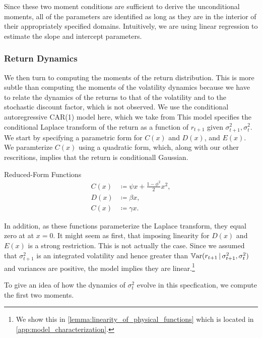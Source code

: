 \documentclass[11pt, letterpaper, twoside, final]{article}
\begin{document}
Since these two moment conditions are sufficient to derive the unconditional moments, all of the parameters are identified as long as they are in the interior of their appropriately specified domains. Intuitively, we are using linear regression to estimate the slope and intercept parameters.

\subsubsection{Return Dynamics}

We then turn to computing the moments of the return distribution.  This is more subtle than computing the moments of the volatility dynamics because we have to relate the dynamics of the returns to that of the volatility and to the stochastic discount factor, which is not observed.  We use the conditional autoregressive CAR(1) model here, which we take from \textcite{darolles2006structural,khrapov2016affine} This model specifies the conditional Laplace transform of the return as a function of $r_{t+1}$ given $\sigma^2_{t+1}, \sigma^2_t$. We start by specifying a parametric form for $C(x)$ and $D(x)$, and $E(x)$. We paramterize $C(x)$ using a quadratic form, which, along with our other rescritions, implies that the return is conditionall Gaussian.

\begin{defn}{Reduced-Form Functions}
  \label{defn:physical_return_dynamics}
  \begin{align}
    C(x) &\coloneqq \psi x + \frac{1 - \phi^2}{2} x^2, \\
    D(x) &\coloneqq \beta x, \\
    C(x) &\coloneqq \gamma x. 
  \end{align}
\end{defn}

In addition, as these functions parameterize the Laplace transform, they equal zero at at $x=0$. It might seem as first, that imposing linearity for $D(x)$ and $E(x)$ is a strong restriction. This is not actually the case. Since we assumed that $\sigma^2_{t+1}$ is an integrated volatility and hence greater than $\operatorname{\mathbb{V}ar}(r_{t+1} \,\vert\, \sigma^2_{t+1}, \sigma^2_{t})$ and variances are positive, the model implies they are linear.\footnote{We show this in \cref{lemma:linearity_of_physical_functions} which is located in \cref{app:model_characterization}.}


To give an idea of how the dynamics of $\sigma^2_t$ evolve in this specfication, we compute the first two moments.
\end{document}
